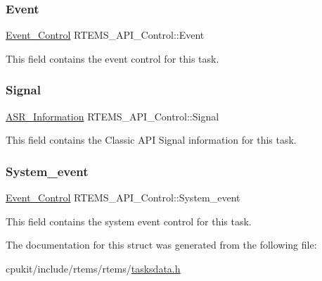 \subsubsection{\texorpdfstring{Event}{Event}}
{\footnotesize\ttfamily \mbox{\hyperlink{structEvent__Control}{Event\+\_\+\+Control}} R\+T\+E\+M\+S\+\_\+\+A\+P\+I\+\_\+\+Control\+::\+Event}

This field contains the event control for this task. \mbox{\label{structRTEMS__API__Control_ad6d6751bc70d36ca5f6e99b1d5a55cef}} 
\subsubsection{\texorpdfstring{Signal}{Signal}}
{\footnotesize\ttfamily \mbox{\hyperlink{structASR__Information}{A\+S\+R\+\_\+\+Information}} R\+T\+E\+M\+S\+\_\+\+A\+P\+I\+\_\+\+Control\+::\+Signal}

This field contains the Classic A\+PI Signal information for this task. \mbox{\label{structRTEMS__API__Control_aef8716dcde100d9dcd33265c54574c8c}} 
\subsubsection{\texorpdfstring{System\_event}{System\_event}}
{\footnotesize\ttfamily \mbox{\hyperlink{structEvent__Control}{Event\+\_\+\+Control}} R\+T\+E\+M\+S\+\_\+\+A\+P\+I\+\_\+\+Control\+::\+System\+\_\+event}

This field contains the system event control for this task. 

The documentation for this struct was generated from the following file\+:\begin{DoxyCompactItemize}
\item 
cpukit/include/rtems/rtems/\mbox{\hyperlink{tasksdata_8h}{tasksdata.\+h}}\end{DoxyCompactItemize}
